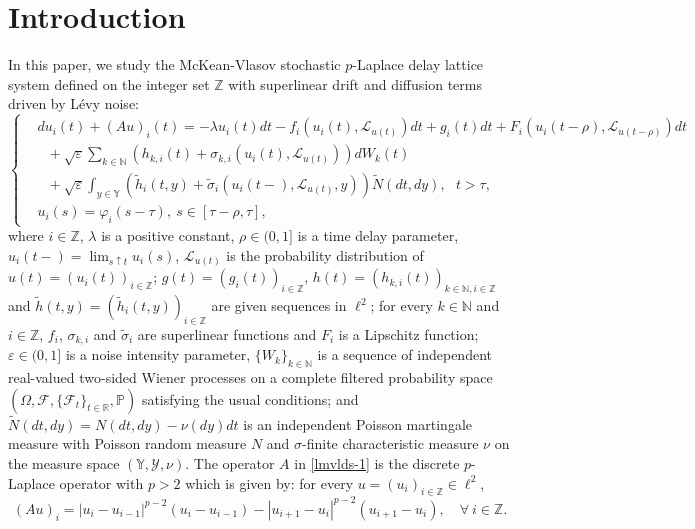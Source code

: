 \documentclass[11pt]{article}
\numberwithin{equation}{section}
\theoremstyle{plain}
\def\be{\begin{equation}}
\def\ee{\end{equation}}
\begin{document}
\tableofcontents

\section{Introduction}
 In this paper, we 
 study the  McKean-Vlasov stochastic $p$-Laplace delay lattice system defined on the integer set $\mathbb{Z}$ with superlinear drift and diffusion terms driven by L\'{e}vy noise:
  \begin{equation} \label{lmvlds-1}
  \left\{
  \begin{aligned}
   & du_i(t)
   + (Au)_i (t)
            = - \lambda u_i(t) dt
          - f_i(u_i(t), \mathcal{L}_{u(t)}) dt
          + g_i(t) dt  
          + F_i(u_i(t - \rho),\mathcal{L}_{u(t - \rho)}) dt \\
   & \ \ \
       + \sqrt{\varepsilon} \sum_{k \in \mathbb{N} }
               \left( h_{k,i}(t) + \sigma_{k,i}(u_i(t), \mathcal{L}_{u(t)})
               \right) dW_k(t) \\
   & \ \ \
       + \sqrt{\varepsilon} \int_{y \in \mathbb{Y}}
             \left( \widetilde{h}_{i}(t,y) + \widetilde{\sigma}_{i}(u_i(t-),\mathcal{L}_{u(t)},y)
             \right) \widetilde{N}(dt,dy),  \ \ \  t > \tau,  \\
   & u_i(s) = \varphi_i(s-\tau),\  s \in [\tau-\rho, \tau],
  \end{aligned}
  \right.
\end{equation}
 where
 $i \in \mathbb{Z}$,
 $\lambda$ is a positive constant,  
 $\rho \in (0,1]$ is a time delay parameter,
 $u_i(t-) = \lim_{s \uparrow t} u_i(s)$,
 $\mathcal{L}_{u(t)} $ is the probability distribution of $u(t) = (u_i(t))_{i \in \mathbb{Z}}$;
 $g(t) = (g_i(t))_{i \in \mathbb{Z}}$, $h(t) = (h_{k,i}(t))_{k \in \mathbb{N}, i \in \mathbb{Z}} $
 and $ \widetilde{h}(t,y) = (\tilde{h}_{i}(t,y))_{ i \in \mathbb{Z}}$ are  given    sequences
 in $\ell^2$; 
 for every $k \in \mathbb{N}$ and $i \in \mathbb{Z}$,
 $f_i$, $\sigma_{k,i}$
 and  $\widetilde{\sigma}_{i}$ are superlinear functions
 and   
 $F_i$ is a Lipschitz   function;
 $\varepsilon \in (0,1]$ is  a noise intensity parameter,
 $\{W_k\}_{k \in \mathbb{N}}$ is a sequence of independent real-valued two-sided Wiener processes on a complete filtered probability space
 $(\Omega, \mathcal{F}, \{\mathcal{F}_t\}_{t \in \mathbb{R}}, \mathbb{P})$
 satisfying the usual conditions;
 and
 $\widetilde{N} (dt, dy)
 = {N} (dt, dy) -\nu (dy) dt
 $ 
 is an independent Poisson martingale measure with Poisson random measure $N$ 
 and $\sigma$-finite characteristic measure $\nu$ on the measure space
 $(\mathbb{Y}, \mathcal{Y}, \nu)$.
 The operator $A$ in \eqref{lmvlds-1}
 is the discrete
 $p$-Laplace operator
 with $p>2$ which is
 given by:
 for every 
 $ u =(u_i)_{i
 	\in \mathbb{Z}}
 \in \ell^2$,
   \be\label{mar02a1}
   (Au)_i
   =  |u_{i}  - u_{i-1}|^{p-2} \left( u_{i}  - u_{i-1}\right)
- |u_{i+1} - u_{i}|^{p-2} \left( u_{i+1}  - u_i \right)
  ,
\quad \forall \  i
\in \mathbb{Z}.
\ee 
\end{document}
